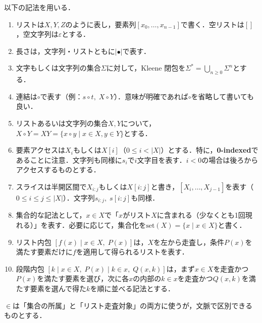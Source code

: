 \documentclass[../main-detail.tex]{subfiles}
\begin{document}
\begin{definition}[文字列とリストの基本記法]
以下の記法を用いる．
\begin{enumerate}[label=(\arabic*)]
    \item リストは$X,Y,Z$のように表し，要素列$[x_0,\ldots,x_{n-1}]$で書く．空リストは$[]$，空文字列は$\varepsilon$とする．
    \item 長さは，文字列・リストともに$|\bullet|$で表す．
    \item 文字もしくは文字列の集合$\Sigma$に対して，Kleene 閉包を$\Sigma^* = \bigcup_{n\ge 0} \Sigma^n$とする．
    \item 連結は$\circ$で表す（例：$s\circ t,\; X\circ Y$）．意味が明確であれば$\circ$を省略して書いても良い．
    \item リストあるいは文字列の集合$X, Y$について，$X \circ Y = XY = \{x\circ y \mid x\in X, y\in Y\}$とする．
    \item 要素アクセスは$X_i$もしくは$X[i]$（$0\le i<|X|$）とする．特に，\textbf{0-indexed}であることに注意．文字列も同様に$s_i$で$i$文字目を表す．$i < 0$の場合は後ろからアクセスするものとする．
    \item スライスは半開区間で$X_{i:j}$もしくは$X[i:j]$と書き，$[X_i,\ldots,X_{j-1}]$を表す（$0\le i\le j\le |X|$）．文字列$s_{i:j},\; s[i:j]$も同様．
    \item 集合的な記法として，$x\in X$で「$x$がリスト$X$に含まれる（少なくとも1回現れる）」を表す．必要に応じて，集合化を$\mathrm{set}(X)=\{x\mid x\in X\}$と書く．
    \item リスト内包 $[f(x)\mid x\in X,\; P(x)]$は，$X$を左から走査し，条件$P(x)$を満たす要素だけに$f$を適用して得られるリストを表す．
    \item 段階内包 $[k\mid x\in X,\; P(x)\mid k\in x,\; Q(x,k)]$は，まず$x\in X$を走査かつ$P(x)$を満たす要素を選び，次に各$x$の内部の$k\in x$を走査かつ$Q(x,k)$を満たす要素を選んで得た$k$を順に並べる記法とする．
\end{enumerate}
\end{definition}
\begin{remark}
$\in$は「集合の所属」と「リスト走査対象」の両方に使うが，文脈で区別できるものとする．
\end{remark}
\end{document}

